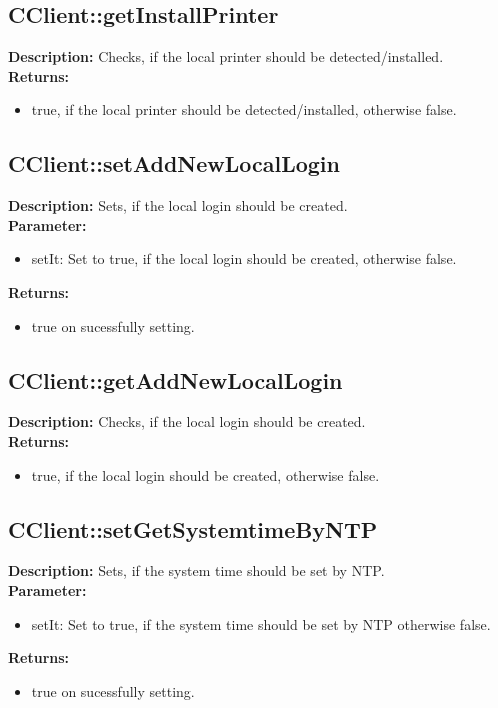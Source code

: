 \subsection{CClient::getInstallPrinter}
\textbf{Description:} Checks, if the local printer should be detected/installed.\\
\textbf{Returns:}
\begin{itemize}
\item true, if the local printer should be detected/installed, otherwise false.
\end{itemize}

\subsection{CClient::setAddNewLocalLogin}
\textbf{Description:} Sets, if the local login should be created.\\
\textbf{Parameter:}
\begin{itemize}
\item setIt: Set to true, if the local login should be created, otherwise false.
\end{itemize}
\textbf{Returns:}
\begin{itemize}
\item true on sucessfully setting.
\end{itemize}

\subsection{CClient::getAddNewLocalLogin}
\textbf{Description:} Checks, if the local login should be created.\\
\textbf{Returns:}
\begin{itemize}
\item true, if the local login should be created, otherwise false.
\end{itemize}

\subsection{CClient::setGetSystemtimeByNTP}
\textbf{Description:} Sets, if the system time should be set by NTP.\\
\textbf{Parameter:}
\begin{itemize}
\item setIt: Set to true, if the system time should be set by NTP otherwise false.
\end{itemize}
\textbf{Returns:}
\begin{itemize}
\item true on sucessfully setting.
\end{itemize}

